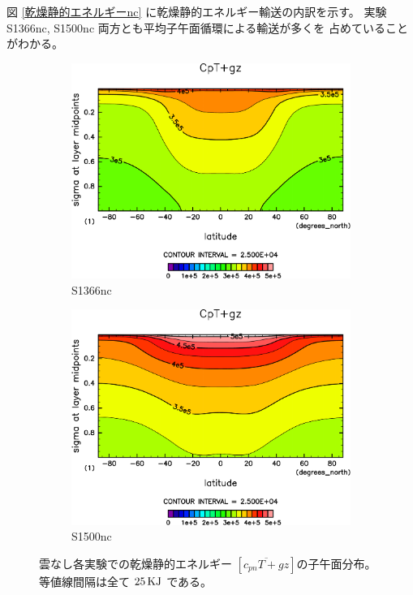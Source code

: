 \documentclass[body]{subfiles}
\begin{document}
図 \ref{乾燥静的エネルギーnc} に乾燥静的エネルギー輸送の内訳を示す。
実験 S1366nc, S1500nc 両方とも平均子午面循環による輸送が多くを
占めていることがわかる。

\begin{figure}[t]
	\centering
	\begin{subfigure}{.4\textwidth}
		\centering
		\includegraphics[width=\columnwidth]{S1366-nc/CpT+gz,time=3650:4015-crop-rotate.pdf}
		\caption{S1366nc}\label{CpT+gzS1366nc}
	\end{subfigure}
	\begin{subfigure}{.4\textwidth}
		\centering
		\includegraphics[width=\columnwidth]{S1500-nc/CpT+gz,time=3650:4015-crop-rotate.pdf}
		\caption{S1500nc}\label{CpT+gzS1500nc}
	\end{subfigure}
	\caption[雲なし各実験での乾燥静的エネルギーの子午面分布]{
		雲なし各実験での乾燥静的エネルギー \([\overline{c_{pn}T+gz}]\)の子午面分布。
		等値線間隔は全て \(25\hmu{KJ}\) である。
	}\label{Cp+gznc}
\end{figure}
\end{document}
